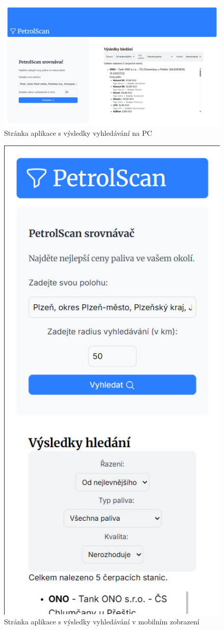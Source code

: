 \begin{figure}
    \centering
    \includegraphics[width=\textwidth]{Figures/web-search-desktop.jpg}
    \caption{Stránka aplikace s výsledky vyhledávání na PC}
    \label{fig:web-search-desktop}
\end{figure}

\begin{figure}
    \centering
    \includegraphics[width=0.5\linewidth]{Figures/web-search-mobile.jpg}
    \caption{Stránka aplikace s výsledky vyhledávání v mobilním zobrazení}
    \label{fig:web-search-mobile}
\end{figure}

